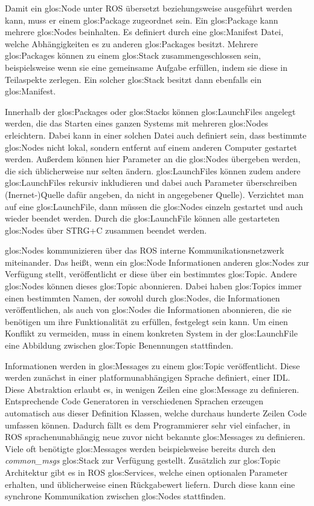 Damit ein \gls{glos:Node} unter \gls{ROS} übersetzt beziehungsweise ausgeführt werden kann, muss er einem \gls{glos:Package} zugeordnet sein. Ein \gls{glos:Package} kann mehrere \glspl{glos:Node} beinhalten. Es definiert durch eine \gls{glos:Manifest} Datei, welche Abhängigkeiten es zu anderen \glspl{glos:Package} besitzt. Mehrere \glspl{glos:Package} können zu einem \gls{glos:Stack} zusammengeschlossen sein, beispielsweise wenn sie eine gemeinsame Aufgabe erfüllen, indem sie diese in Teilaspekte zerlegen. Ein solcher \gls{glos:Stack} besitzt dann ebenfalls ein \gls{glos:Manifest}.

Innerhalb der \glspl{glos:Package} oder \glspl{glos:Stack} können \glspl{glos:LaunchFile} angelegt werden, die das Starten eines ganzen Systems mit mehreren \glspl{glos:Node} erleichtern. Dabei kann in einer solchen Datei auch definiert sein, dass bestimmte \glspl{glos:Node} nicht lokal, sondern entfernt auf einem anderen Computer gestartet werden. Außerdem können hier Parameter an die \glspl{glos:Node} übergeben werden, die sich üblicherweise nur selten ändern. \glspl{glos:LaunchFile} können zudem andere \glspl{glos:LaunchFile} rekursiv inkludieren und dabei auch Parameter überschreiben{\color{red} (Inernet-)Quelle dafür angeben, da nicht in angegebener Quelle)}. Verzichtet man auf eine \gls{glos:LaunchFile}, dann müssen die \glspl{glos:Node} einzeln gestartet und auch wieder beendet werden. Durch die \gls{glos:LaunchFile} können alle gestarteten \glspl{glos:Node} über STRG+C zusammen beendet werden.

\glspl{glos:Node} kommunizieren über das \gls{ROS} interne Kommunikationsnetzwerk miteinander. Das heißt, wenn ein \gls{glos:Node} Informationen anderen \glspl{glos:Node} zur Verfügung stellt, veröffentlicht er diese über ein bestimmtes \gls{glos:Topic}. Andere \glspl{glos:Node} können dieses \gls{glos:Topic} abonnieren. Dabei haben \glspl{glos:Topic} immer einen bestimmten Namen, der sowohl durch \glspl{glos:Node}, die Informationen veröffentlichen, als auch von \glspl{glos:Node} die Informationen abonnieren, die sie benötigen um ihre Funktionalität zu erfüllen, festgelegt sein kann. Um einen Konflikt zu vermeiden, muss in einem konkreten System in der \gls{glos:LaunchFile} eine Abbildung zwischen \gls{glos:Topic} Benennungen stattfinden.

Informationen werden in \glspl{glos:Message} zu einem \gls{glos:Topic} veröffentlicht. Diese werden zunächst in einer platformunabhängigen Sprache definiert, einer \gls{IDL}. Diese Abstraktion erlaubt es, in wenigen Zeilen eine \gls{glos:Message} zu definieren. Entsprechende Code Generatoren in verschiedenen Sprachen erzeugen automatisch aus dieser Definition Klassen, welche durchaus hunderte Zeilen Code umfassen können. Dadurch fällt es dem Programmierer sehr viel einfacher, in \gls{ROS} sprachenunabhängig neue zuvor nicht bekannte \glspl{glos:Message} zu definieren. Viele oft benötigte \glspl{glos:Message} werden beispielsweise bereits durch den \emph{common\_msgs} \gls{glos:Stack} zur Verfügung gestellt. Zusätzlich zur \gls{glos:Topic} Architektur gibt es in \gls{ROS} \glspl{glos:Service}, welche einen optionalen Parameter erhalten, und üblicherweise einen Rückgabewert liefern. Durch diese kann eine synchrone Kommunikation zwischen \glspl{glos:Node} stattfinden. 

